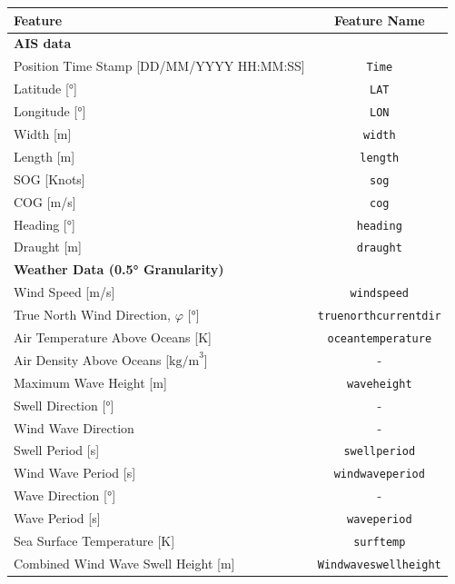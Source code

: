 \begin{table}
    \centering
    {\begin{tabular}{ |p{8cm}|c| }
    \hline
    \textbf{Feature} & \textbf{Feature Name}  \\
    \hline
    \multicolumn{2}{|l|}{\textbf{AIS data}}\\
    \hline
    Position Time Stamp [DD\slash MM\slash YYYY HH:MM:SS] & {\tt Time} \\
    \hline
    Latitude [°] & {\tt LAT}   \\
    \hline
    Longitude [°] & {\tt LON}  \\
    \hline
    Width [m] & {\tt width}  \\
    \hline
    Length [m] & {\tt length}\\
    \hline
    SOG [Knots] & {\tt sog} \\
    \hline
    COG [m/s] & {\tt cog}  \\
    \hline
    Heading [°] & {\tt heading}  \\
    \hline
    Draught [m] & {\tt draught} \\
    \hline
    \multicolumn{2}{|l|}{\textbf{Weather Data (0.5° Granularity)}}\\
    \hline
    Wind Speed [m/s] & {\tt windspeed} \\
    \hline
    True North Wind Direction, $\varphi$ [°] & {\tt truenorthcurrentdir} \\
    \hline
    Air Temperature Above Oceans [K] & {\tt oceantemperature} \\
    \hline
    Air Density Above Oceans [$\text{kg/m}^3$]& - \\
    \hline
    Maximum Wave Height [m] & {\tt waveheight} \\
    \hline
    Swell Direction [°] & - \\
    \hline
    Wind Wave Direction & - \\
    \hline
    Swell Period [s] & {\tt swellperiod} \\
    \hline
    Wind Wave Period [s] & {\tt windwaveperiod}\\
    \hline
    Wave Direction [°] & - \\
    \hline
    Wave Period [s] & {\tt waveperiod}\\
    \hline
    Sea Surface Temperature [K] & {\tt surftemp}\\
    \hline
    Combined Wind Wave Swell Height [m] &  {\tt Windwaveswellheight} \\

\end{tabular}}
\end{table}

